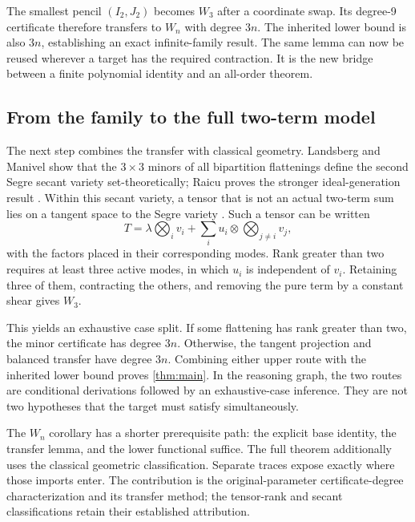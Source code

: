The smallest pencil $(I_2,J_2)$ becomes $W_3$ after a coordinate swap. Its degree-9 certificate therefore transfers to $W_n$ with degree $3n$. The inherited lower bound is also $3n$, establishing an exact infinite-family result. The same lemma can now be reused wherever a target has the required contraction. It is the new bridge between a finite polynomial identity and an all-order theorem.

\subsection{From the family to the full two-term model}

The next step combines the transfer with classical geometry. Landsberg and Manivel show that the $3\times3$ minors of all bipartition flattenings define the second Segre secant variety set-theoretically; Raicu proves the stronger ideal-generation result \cite{landsbergmanivel,raicu}. Within this secant variety, a tensor that is not an actual two-term sum lies on a tangent space to the Segre variety \cite[arXiv version, Corollary~1 and Notation~1]{ballicobernardi}. Such a tensor can be written
\begin{equation}\label{eq:tangent-main}
 T=\lambda\bigotimes_i v_i+
       \sum_i u_i\otimes\bigotimes_{j\ne i}v_j,
\end{equation}
with the factors placed in their corresponding modes. Rank greater than two requires at least three active modes, in which $u_i$ is independent of $v_i$. Retaining three of them, contracting the others, and removing the pure term by a constant shear gives $W_3$.

This yields an exhaustive case split. If some flattening has rank greater than two, the minor certificate has degree $3n$. Otherwise, the tangent projection and balanced transfer have degree $3n$. Combining either upper route with the inherited lower bound proves \cref{thm:main}. In the reasoning graph, the two routes are conditional derivations followed by an exhaustive-case inference. They are not two hypotheses that the target must satisfy simultaneously.

The $W_n$ corollary has a shorter prerequisite path: the explicit base identity, the transfer lemma, and the lower functional suffice. The full theorem additionally uses the classical geometric classification. Separate traces expose exactly where those imports enter. The contribution is the original-parameter certificate-degree characterization and its transfer method; the tensor-rank and secant classifications retain their established attribution.

